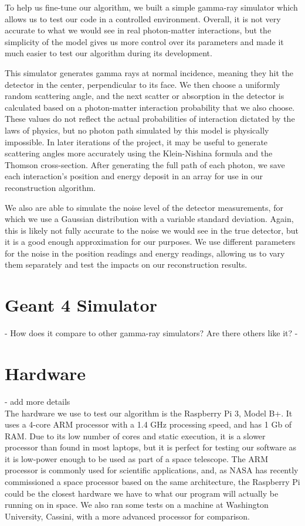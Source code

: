 To help us fine-tune our algorithm, we built a simple gamma-ray simulator which allows us to test our code in a controlled environment. Overall, it is not very accurate to what we would see in real photon-matter interactions, but the simplicity of the model gives us more control over its parameters and made it much easier to test our algorithm during its development.

This simulator generates gamma rays at normal incidence, meaning they hit the detector in the center, perpendicular to its face. We then choose a uniformly random scattering angle, and the next scatter or absorption in the detector is calculated based on a photon-matter interaction probability that we also choose. These values do not reflect the actual probabilities of interaction dictated by the laws of physics, but no photon path simulated by this model is physically impossible. In later iterations of the project, it may be useful to generate scattering angles more accurately using the Klein-Nishina formula and the Thomson cross-section\cite{klein-nishina}. After generating the full path of each photon, we save each interaction's position and energy deposit in an array for use in our reconstruction algorithm.

We also are able to simulate the noise level of the detector measurements, for which we use a Gaussian distribution with a variable standard deviation. Again, this is likely not fully accurate to the noise we would see in the true detector, but it is a good enough approximation for our purposes. We use different parameters for the noise in the position readings and energy readings, allowing us to vary them separately and test the impacts on our reconstruction results.

\section{Geant 4 Simulator}
- How does it compare to other gamma-ray simulators? Are there others like it?
- 

\section{Hardware} - add more details\\
The hardware we use to test our algorithm is the Raspberry Pi 3, Model B+. It uses a 4-core ARM processor with a 1.4 GHz processing speed, and has 1 Gb of RAM. Due to its low number of cores and static execution, it is a slower processor than found in most laptops, but it is perfect for testing our software as it is low-power enough to be used as part of a space telescope. The ARM processor is commonly used for scientific applications, and, as NASA has recently commissioned a space processor based on the same architecture, the Raspberry Pi could be the closest hardware we have to what our program will actually be running on in space. We also ran some tests on a machine at Washington University, Cassini, with a more advanced processor for comparison.

